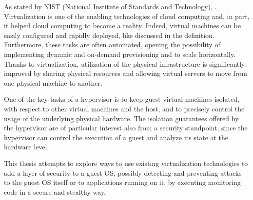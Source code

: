 As stated by NIST (National Institute of Standards and Technology), 
 \cite{nistcloud}.
Virtualization is one of the enabling technologies of cloud computing and, in part, it helped cloud computing to become a reality. Indeed, virtual machines can be easily configured and rapidly deployed, like discussed in the definition. Furthermore, these tasks are often automated, opening the possibility of implementing dynamic and on-demand provisioning and to scale horizontally. Thanks to virtualization, utilization of the physical infrastructure is significantly improved by sharing physical resources and allowing virtual servers to move from one physical machine to another. 
\par
One of the key tasks of a hypervisor is to keep guest virtual machines isolated, with respect to other virtual machines and the host, and to precisely control the usage of the underlying physical hardware. The isolation guarantees offered by the hypervisor are of particular interest also from a security standpoint, since the hypervisor can control the execution of a guest and analyze its state at the hardware level. 
\par
This thesis attempts to explore ways to use existing virtualization technologies to add a layer of security to a guest OS, possibly detecting and preventing attacks to the guest OS itself or to applications running on it, by executing monitoring code in a secure and stealthy way. 

